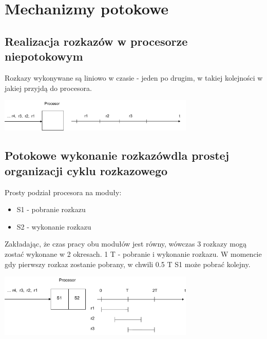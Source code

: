 \newpage
\section{Mechanizmy potokowe}
	\subsection{Realizacja rozkazów w procesorze niepotokowym}
		Rozkazy wykonywane są liniowo w czasie - jeden po drugim, w takiej kolejności w jakiej przyjdą do procesora.
		\begin{center}
			\includegraphics[width=0.7\textwidth]{./images/potok01}
		\end{center}
   	\subsection{Potokowe wykonanie rozkazówdla prostej organizacji cyklu rozkazowego}
   		Prosty podział procesora na moduły:
	   	\begin{itemize}
	   		\item S1 - pobranie rozkazu
	   		\item S2 - wykonanie rozkazu
	   	\end{itemize}
   		Zakładając, że czas pracy obu modułów jest równy, wówczas 3 rozkazy mogą zostać wykonane w 2 okresach. 1 T - pobranie i wykonanie rozkazu. W momencie gdy pierwszy rozkaz zostanie pobrany, w chwili 0.5 T S1 może pobrać kolejny.
   		\begin{center}
   			\includegraphics[width=0.7\textwidth]{./images/potok02}
   		\end{center}
